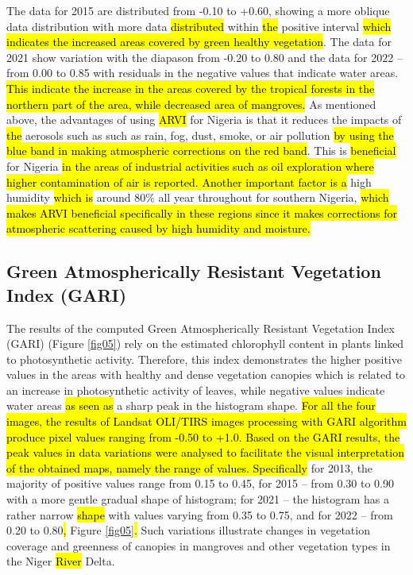 \documentclass[jmse,article,submit,pdftex,moreauthors]{Definitions/mdpi}
\begin{document}
The data for 2015 are distributed from -0.10 to +0.60,\hl{ }showing a more oblique data distribution with more data \hl{distributed }within \hl{the }positive interval \hl{which indicates the increased areas covered by green healthy vegetation}. The data for 2021 show variation with the diapason from -0.20 to 0.80 and the data for 2022 -- from 0.00 to 0.85 with residuals in the negative values that indicate water areas. \hl{This indicate the increase in the areas covered by the tropical forests in the northern part of the area, while decreased area of mangroves. }As mentioned above, the advantages of using \hl{ARVI} for Nigeria is that it reduces the impacts of \hl{the }aerosols such as such as rain, fog, dust, smoke, or air pollution \hl{by using the blue band in making atmospheric corrections on the red band}. This is \hl{beneficial} for Nigeria \hl{in the areas of industrial activities such as oil exploration where higher contamination of air is reported. Another important factor is a }high humidity \hl{which is }around 80\% all year throughout for southern Nigeria, \hl{which makes ARVI beneficial specifically in these regions since it makes corrections for atmospheric scattering caused by high humidity and moisture.}

\subsection{Green Atmospherically Resistant Vegetation Index (GARI)}

The results of the computed Green Atmospherically Resistant Vegetation Index (GARI) (Figure \ref{fig05}) rely on the estimated chlorophyll content in plants\hl{ }linked to photosynthetic activity. Therefore, this index demonstrates the higher positive values in the areas with healthy and dense vegetation canopies which is related to an increase in photosynthetic activity of leaves, while negative values indicate water areas \hl{as seen as} a sharp peak in the histogram shape. \hl{For all the four images, the results of Landsat OLI/TIRS images processing with GARI algorithm produce pixel values ranging from -0.50 to +1.0. Based on the GARI results, the peak values in data variations were analysed to facilitate the visual interpretation of the obtained maps, namely the range of values. Specifically }for 2013, the majority of positive values range from 0.15 to 0.45, for 2015 -- from 0.30 to 0.90 with a more gentle gradual shape of histogram; for 2021 -- the histogram has a rather narrow \hl{shape} with values varying from 0.35 to 0.75, and for 2022 -- from 0.20 to 0.80\hl{, }Figure \ref{fig05}\hl{. }Such variations illustrate changes in vegetation coverage and greenness of canopies in mangroves and other vegetation types in the Niger \hl{River} Delta. 
\end{document}
